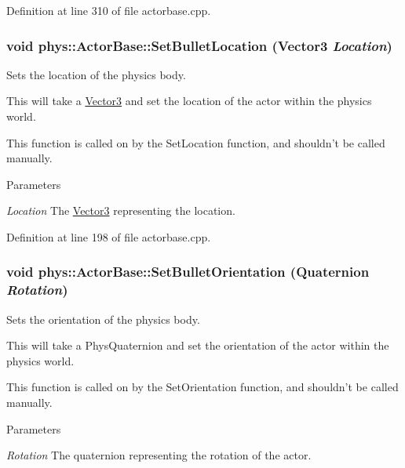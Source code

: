 Definition at line 310 of file actorbase.cpp.

\hypertarget{classphys_1_1ActorBase_aa7ab524d2905e640cea6324cce9ccfdb}{
\subsubsection[{SetBulletLocation}]{\setlength{\rightskip}{0pt plus 5cm}void phys::ActorBase::SetBulletLocation ({\bf Vector3} {\em Location})}}
\label{d8/d0f/classphys_1_1ActorBase_aa7ab524d2905e640cea6324cce9ccfdb}


Sets the location of the physics body. 

This will take a \hyperlink{classphys_1_1Vector3}{Vector3} and set the location of the actor within the physics world. \par
 This function is called on by the SetLocation function, and shouldn't be called manually. 
\begin{DoxyParams}{Parameters}
\item[{\em Location}]The \hyperlink{classphys_1_1Vector3}{Vector3} representing the location. \end{DoxyParams}


Definition at line 198 of file actorbase.cpp.

\hypertarget{classphys_1_1ActorBase_a492244ac46ced53b809f436da992bc84}{
\subsubsection[{SetBulletOrientation}]{\setlength{\rightskip}{0pt plus 5cm}void phys::ActorBase::SetBulletOrientation ({\bf Quaternion} {\em Rotation})}}
\label{d8/d0f/classphys_1_1ActorBase_a492244ac46ced53b809f436da992bc84}


Sets the orientation of the physics body. 

This will take a PhysQuaternion and set the orientation of the actor within the physics world. \par
 This function is called on by the SetOrientation function, and shouldn't be called manually. 
\begin{DoxyParams}{Parameters}
\item[{\em Rotation}]The quaternion representing the rotation of the actor. \end{DoxyParams}


